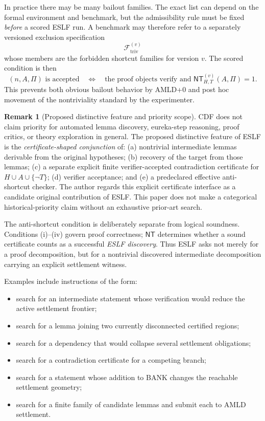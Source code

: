 \documentclass[11pt]{article}
\theoremstyle{definition}
\newtheorem{remark}[theorem]{Remark}
\begin{document}
In practice there may be many bailout families. The exact list can depend on the formal environment and benchmark, but the admissibility rule must be fixed \emph{before} a scored ESLF run. A benchmark may therefore refer to a separately versioned exclusion specification
\[
\mathcal F_{\mathrm{triv}}^{(v)}
\]
whose members are the forbidden shortcut families for version $v$. The scored condition is then
\[
(n,A,\Pi)\text{ is accepted}\quad\Longleftrightarrow\quad
\text{the proof objects verify and }\mathsf{NT}_{H,T}^{(v)}(A,\Pi)=1.
\]
This prevents both obvious bailout behavior by AMLD+0 and post hoc movement of the nontriviality standard by the experimenter.

\begin{remark}[Proposed distinctive feature and priority scope]
CDF does not claim priority for automated lemma discovery, eureka-step reasoning, proof critics, or theory exploration in general. The proposed distinctive feature of ESLF is the \emph{certificate-shaped conjunction} of: (a) nontrivial intermediate lemmas derivable from the original hypotheses; (b) recovery of the target from those lemmas; (c) a separate explicit finite verifier-accepted contradiction certificate for $H\cup A\cup\{\neg T\}$; (d) verifier acceptance; and (e) a predeclared effective anti-shortcut checker. The author regards this explicit certificate interface as a candidate original contribution of ESLF. This paper does not make a categorical historical-priority claim without an exhaustive prior-art search.
\end{remark}

The anti-shortcut condition is deliberately separate from logical soundness. Conditions (i)--(iv) govern proof correctness; $\mathsf{NT}$ determines whether a sound certificate counts as a successful \emph{ESLF discovery}. Thus ESLF asks not merely for a proof decomposition, but for a nontrivial discovered intermediate decomposition carrying an explicit settlement witness.

Examples include instructions of the form:
\begin{itemize}
\item search for an intermediate statement whose verification would reduce the active settlement frontier;
\item search for a lemma joining two currently disconnected certified regions;
\item search for a dependency that would collapse several settlement obligations;
\item search for a contradiction certificate for a competing branch;
\item search for a statement whose addition to BANK changes the reachable settlement geometry;
\item search for a finite family of candidate lemmas and submit each to AMLD settlement.
\end{itemize}
\end{document}
